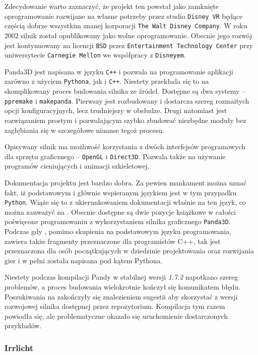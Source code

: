 \documentclass[11pt]{mwrep}
\begin{document}
      Zdecydowanie warto zaznaczyć, że projekt ten powstał jako zamknięte oprogramowanie rozwijane na własne potrzeby przez studio \texttt{Disney VR} będące częścią dobrze wszystkim znanej korporacji \texttt{The Walt Disney Company}. W roku 2002 silnik został opublikowany jako wolne oprogramowanie. Obecnie jego rozwój jest kontynuowany na licencji \texttt{BSD} przez \texttt{Entertainment Technology Center} przy uniwersytecie \texttt{Carnegie Mellon} we współpracy z \texttt{Disneyem}.

      Panda3D jest napisana w języku \texttt{C++} i pozwala na programowanie aplikacji zarówno z użyciem \texttt{Pythona}, jak i \texttt{C++}. Niestety przekłada się to na skomplikowany proces budowania silnika ze źródeł. Dostępne są dwa systemy -- \texttt{ppremake} i \texttt{makepanda}. Pierwszy jest rozbudowany i dostarcza szereg rozmaitych opcji konfiguracyjnych, lecz trudniejszy w obsłudze. Drugi natomiast jest rozwiązaniem prostym i pozwalającym szybko zbudować niezbędne moduły bez zagłębiania się w szczegółowe niuanse tegoż procesu.

      Opisywany silnik ma możliwość korzystania z dwóch interfejsów programowych dla sprzętu graficznego -- \texttt{OpenGL} i \texttt{Direct3D}. Pozwala także na używanie programów cieniujących i animacji szkieletowej.

      Dokumentacja projektu jest bardzo dobra. Za pewien mankament można uznać fakt, iż podstawowym i głównie wspieranym językiem jest w tym przypadku \texttt{Python}. Wiąże się to z ukierunkowaniem dokumentacji właśnie na ten język, co można zauważyć na \cite{panda}. Obecnie dostępne są dwie pozycje książkowe w całości poświęcone programowaniu z wykorzystaniem silnika graficznego \texttt{Panda3D}. Podczas gdy \cite{pandab1}, pomimo skupienia na podstawowym języku programowania, zawiera także fragmenty przeznaczone dla programistów C++, tak \cite{pandab2} jest przeznaczona dla osób początkujących w dziedzinie projektowania oraz rozwijania gier i w pełni została napisana pod kątem Pythona.

      Niestety podczas kompilacji Pandy w stabilnej wersji \textit{1.7.2} napotkano szereg problemów, a proces budowania wielokrotnie kończył się komunikatem błędu. Poszukiwania na \cite{pandaf} zakończyły się znalezieniem sugestii aby skorzystać z wersji rozwojowej silnika dostępnej przez repozytorium. Kompilacja tym razem powiodła się, ale problematyczne okazało się uruchomienie dostarczonych przykładów.

      \subsubsection{Irrlicht}
\end{document}
